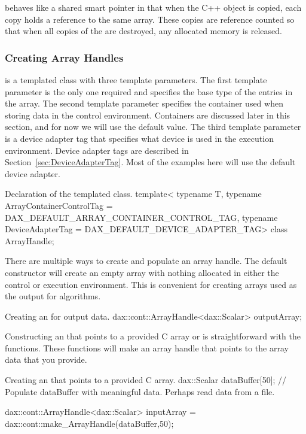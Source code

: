  behaves like a shared smart pointer in that when the
C++ object is copied, each copy holds a reference to the same array. These
copies are reference counted so that when all copies of the
 are destroyed, any allocated memory is released.

\subsubsection{Creating Array Handles}

 is a templated class with three template
parameters. The first template parameter is the only one required and
specifies the base type of the entries in the array. The second template
parameter specifies the container used when storing data in the control
environment. Containers are discussed later in this section, and for now we
will use the default value. The third template parameter is a device
adapter tag that specifies what device is used in the execution
environment. Device adapter tags are described in
Section~\ref{sec:DeviceAdapterTag}. Most of the examples here will use the
default device adapter.

\begin{daxexample}{Declaration of the \protect{} templated class.}
template<
    typename T,
    typename ArrayContainerControlTag = DAX_DEFAULT_ARRAY_CONTAINER_CONTROL_TAG,
    typename DeviceAdapterTag = DAX_DEFAULT_DEVICE_ADAPTER_TAG>
class ArrayHandle;
\end{daxexample}

There are multiple ways to create and populate an array handle. The default
 constructor will create an empty array with nothing
allocated in either the control or execution environment. This is
convenient for creating arrays used as the output for algorithms.

\begin{daxexample}{Creating an  for output data.}
dax::cont::ArrayHandle<dax::Scalar> outputArray;
\end{daxexample}

Constructing an  that points to a provided C array or
 is straightforward with the
 functions. These functions will make an array
handle that points to the array data that you provide.

\begin{daxexample}{Creating an  that points to a provided C array.}
dax::Scalar dataBuffer[50];
// Populate dataBuffer with meaningful data. Perhaps read data from a file.

dax::cont::ArrayHandle<dax::Scalar> inputArray = dax::cont::make_ArrayHandle(dataBuffer,50);
\end{daxexample}

